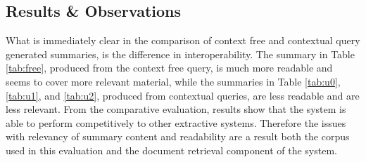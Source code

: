 \subsection{Results \& Observations}
What is immediately clear in the comparison of context free and contextual query generated summaries, is the difference in interoperability. The summary in Table \ref{tab:free}, produced from the context free query, is much more readable and seems to cover more relevant material, while the summaries in Table \ref{tab:u0}, \ref{tab:u1}, and \ref{tab:u2}, produced from contextual queries, are less readable and are less relevant. From the comparative evaluation, results show that the system is able to perform competitively to other extractive systems. Therefore the issues with relevancy of summary content and readability are a result both the corpus used in this evaluation and the document retrieval component of the system.

